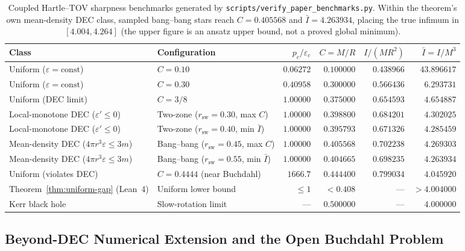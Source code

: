 \documentclass[11pt]{article}
\theoremstyle{plain}
\theoremstyle{definition}
\newcommand{\eps}{\varepsilon}
\newcommand{\Ibar}{\bar{I}}
\begin{document}
\begin{table}[ht]
\centering
\small
\begin{tabular}{@{}llrrrr@{}}
\toprule
Class & Configuration & $p_c/\eps_c$ & $C = M/R$ & $I/(MR^2)$ & $\Ibar = I/M^3$ \\
\midrule
Uniform ($\eps = \text{const}$) & $C = 0.10$ & $0.06272$ & $0.100000$ & $0.438966$ & $43.896617$ \\
Uniform ($\eps = \text{const}$) & $C = 0.30$ & $0.40958$ & $0.300000$ & $0.566436$ & $6.293731$ \\
Uniform (DEC limit) & $C = 3/8$ & $1.00000$ & $0.375000$ & $0.654593$ & $4.654887$ \\
\midrule
Local-monotone DEC ($\eps' \le 0$) & Two-zone ($r_{\mathrm{sw}} = 0.30$, max $C$) & $1.00000$ & $0.398800$ & $0.684201$ & $4.302025$ \\
Local-monotone DEC ($\eps' \le 0$) & Two-zone ($r_{\mathrm{sw}} = 0.40$, min $\Ibar$) & $1.00000$ & $0.395793$ & $0.671326$ & $4.285459$ \\
\midrule
Mean-density DEC ($4\pi r^3\eps \le 3m$) & Bang--bang ($r_{\mathrm{sw}} = 0.45$, max $C$) & $1.00000$ & $0.405568$ & $0.702238$ & $4.269303$ \\
Mean-density DEC ($4\pi r^3\eps \le 3m$) & Bang--bang ($r_{\mathrm{sw}} = 0.55$, min $\Ibar$) & $1.00000$ & $0.404665$ & $0.698235$ & $4.263934$ \\
\midrule
Uniform (violates DEC) & $C = 0.4444$ (near Buchdahl) & $1666.7$ & $0.444400$ & $0.799034$ & $4.045920$ \\
Theorem~\ref{thm:uniform-gap} (Lean~4) & Uniform lower bound & $\le 1$ & $< 0.408$ & --- & $> 4.004000$ \\
Kerr black hole & Slow-rotation limit & --- & $0.500000$ & --- & $4.000000$ \\
\bottomrule
\end{tabular}
\caption{Coupled Hartle--TOV sharpness benchmarks generated by \texttt{scripts/verify\_paper\_benchmarks.py}. Within the theorem's own mean-density DEC class, sampled bang--bang stars reach $C = 0.405568$ and $\Ibar = 4.263934$, placing the true infimum in $[4.004, 4.264]$ (the upper figure is an ansatz upper bound, not a proved global minimum).}
\label{tab:sharpness}
\end{table}

\subsection{Beyond-DEC Numerical Extension and the Open Buchdahl Problem}
\end{document}
